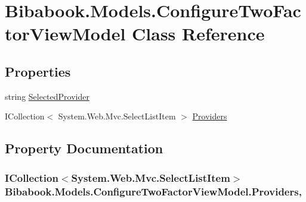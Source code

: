 \hypertarget{class_bibabook_1_1_models_1_1_configure_two_factor_view_model}{}\section{Bibabook.\+Models.\+Configure\+Two\+Factor\+View\+Model Class Reference}
\label{class_bibabook_1_1_models_1_1_configure_two_factor_view_model}
\subsection*{Properties}
\begin{DoxyCompactItemize}
\item 
string \hyperlink{class_bibabook_1_1_models_1_1_configure_two_factor_view_model_a0ccb3f50c860f1e37f665640ca59f919}{Selected\+Provider}
\item 
I\+Collection$<$ System.\+Web.\+Mvc.\+Select\+List\+Item $>$ \hyperlink{class_bibabook_1_1_models_1_1_configure_two_factor_view_model_a05be1850a382457069e24393db6a750a}{Providers}
\end{DoxyCompactItemize}


\subsection{Property Documentation}
\hypertarget{class_bibabook_1_1_models_1_1_configure_two_factor_view_model_a05be1850a382457069e24393db6a750a}{}
\subsubsection[{Providers}]{\setlength{\rightskip}{0pt plus 5cm}I\+Collection$<$System.\+Web.\+Mvc.\+Select\+List\+Item$>$ Bibabook.\+Models.\+Configure\+Two\+Factor\+View\+Model.\+Providers\hspace{0.3cm}{\ttfamily [get]}, {\ttfamily [set]}}\label{class_bibabook_1_1_models_1_1_configure_two_factor_view_model_a05be1850a382457069e24393db6a750a}
\hypertarget{class_bibabook_1_1_models_1_1_configure_two_factor_view_model_a0ccb3f50c860f1e37f665640ca59f919}{}
